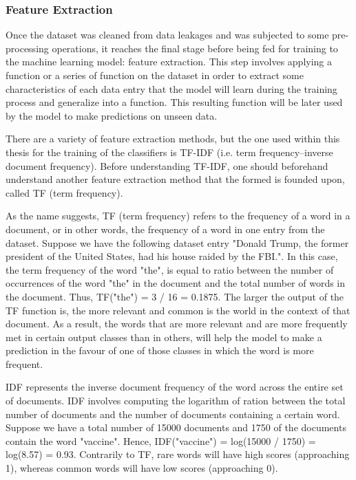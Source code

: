 \subsubsection{Feature Extraction}
Once the dataset was cleaned from data leakages and was subjected to some pre-processing operations, it reaches the final stage before being fed for training to the machine learning model: feature extraction. This step involves applying a function or a series of function on the dataset in order to extract some characteristics of each data entry that the model will learn during the training process and generalize into a function. This resulting function will be later used by the model to make predictions on unseen data.

There are a variety of feature extraction methods, but the one used within this thesis for the training of the classifiers is TF-IDF (i.e. term frequency–inverse document frequency). Before understanding TF-IDF, one should beforehand understand another feature extraction method that the formed is founded upon, called TF (term frequency).

As the name suggests, TF (term frequency) refers to the frequency of a word in a document, or in other words, the frequency of a word in one entry from the dataset. Suppose we have the following dataset entry "Donald Trump, the former president of the United States, had his house raided by the FBI.". In this case, the term frequency of the word "the", is equal to ratio between the number of occurrences of the word "the" in the document and the total number of words in the document. Thus, TF("the") = 3 / 16 = 0.1875. The larger the output of the TF function is, the more relevant and common is the world in the context of that document. As a result, the words that are more relevant and are more frequently met in certain output classes than in others, will help the model to make a prediction in the favour of one of those classes in which the word is more frequent. 

IDF represents the inverse document frequency of the word across the entire set of documents. IDF involves computing the logarithm of ration between the total number of documents and the number of documents containing a certain word. Suppose we have a total number of 15000 documents and 1750 of the documents contain the word "vaccine". Hence, IDF("vaccine") = log(15000 / 1750) = log(8.57) = 0.93. Contrarily to TF, rare words will have high scores (approaching 1), whereas common words will have low scores (approaching 0).

